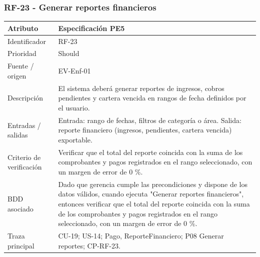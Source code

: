 \documentclass[11pt,a4paper]{article}
\begin{document}
	\subsubsection{RF-23 - Generar reportes financieros}
	\begin{tabularx}{\textwidth}{p{3.2cm}Y}
		\toprule
		\textbf{Atributo} & \textbf{Especificación PE5}\\\midrule
		Identificador & RF-23\\
		Prioridad & Should\\
		Fuente / origen & EV-Enf-01\\
		Descripción & El sistema deberá generar reportes de ingresos, cobros pendientes y cartera vencida en rangos de fecha definidos por el usuario.\\
		Entradas / salidas & Entrada: rango de fechas, filtros de categoría o área. Salida: reporte financiero (ingresos, pendientes, cartera vencida) exportable.\\
		Criterio de verificación & Verificar que el total del reporte coincida con la suma de los comprobantes y pagos registrados en el rango seleccionado, con un margen de error de 0 \%.\\
		BDD asociado & Dado que gerencia cumple las precondiciones y dispone de los datos válidos, cuando ejecuta "Generar reportes financieros", entonces verificar que el total del reporte coincida con la suma de los comprobantes y pagos registrados en el rango seleccionado, con un margen de error de 0 \%.\\
		Traza principal & CU-19; US-14; Pago, ReporteFinanciero; P08 Generar reportes; CP-RF-23.\\
		\bottomrule
	\end{tabularx}
\end{document}
